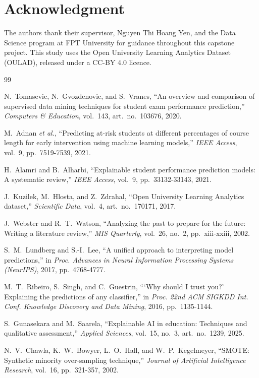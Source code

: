 \documentclass[conference]{IEEEtran}
\begin{document}
\section*{Acknowledgment}
The authors thank their supervisor, Nguyen Thi Hoang Yen, and the Data
Science program at FPT University for guidance throughout this capstone
project. This study uses the Open University Learning Analytics Dataset
(OULAD), released under a CC-BY 4.0 licence.

\begin{thebibliography}{99}

N.~Tomasevic, N.~Gvozdenovic, and S.~Vranes, ``An overview and comparison
of supervised data mining techniques for student exam performance
prediction,'' \emph{Computers \& Education}, vol.~143, art.~no.~103676,
2020.

M.~Adnan \emph{et al.}, ``Predicting at-risk students at different
percentages of course length for early intervention using machine learning
models,'' \emph{IEEE Access}, vol.~9, pp.~7519-7539, 2021.

H.~Alamri and B.~Alharbi, ``Explainable student performance prediction
models: A systematic review,'' \emph{IEEE Access}, vol.~9,
pp.~33132-33143, 2021.

J.~Kuzilek, M.~Hlosta, and Z.~Zdrahal, ``Open University Learning Analytics
dataset,'' \emph{Scientific Data}, vol.~4, art.~no.~170171, 2017.

J.~Webster and R.~T.~Watson, ``Analyzing the past to prepare for the
future: Writing a literature review,'' \emph{MIS Quarterly}, vol.~26,
no.~2, pp.~xiii-xxiii, 2002.

S.~M.~Lundberg and S.-I.~Lee, ``A unified approach to interpreting model
predictions,'' in \emph{Proc. Advances in Neural Information Processing
Systems (NeurIPS)}, 2017, pp.~4768-4777.

M.~T.~Ribeiro, S.~Singh, and C.~Guestrin, ```Why should I trust you?'
Explaining the predictions of any classifier,'' in \emph{Proc. 22nd ACM
SIGKDD Int. Conf. Knowledge Discovery and Data Mining}, 2016,
pp.~1135-1144.

S.~Gunasekara and M.~Saarela, ``Explainable AI in education: Techniques and
qualitative assessment,'' \emph{Applied Sciences}, vol.~15, no.~3,
art.~no.~1239, 2025.

N.~V.~Chawla, K.~W.~Bowyer, L.~O.~Hall, and W.~P.~Kegelmeyer, ``SMOTE:
Synthetic minority over-sampling technique,'' \emph{Journal of Artificial
Intelligence Research}, vol.~16, pp.~321-357, 2002.


\end{thebibliography}
\end{document}
